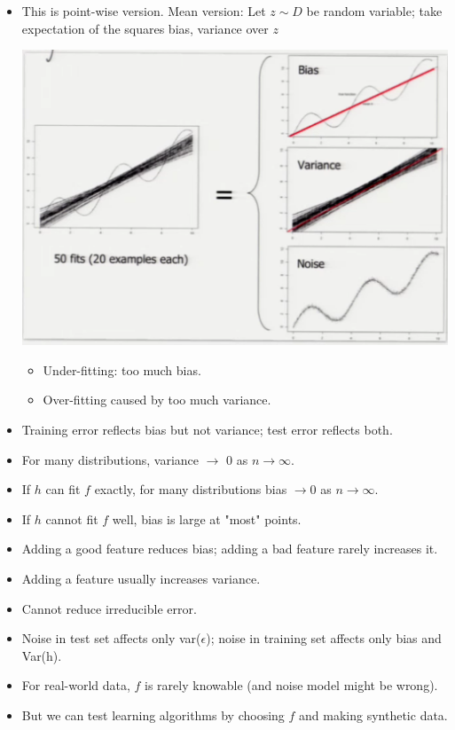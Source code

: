 \documentclass[10pt]{article}
\begin{document}
\begin{itemize}
			\item This is point-wise version. Mean version: Let $z \sim D$ be random variable; take expectation of the squares bias, variance over $z$
				\begin{center}
					\includegraphics[scale=0.5]{images/noise}
				\end{center}
				\begin{itemize}
					\item Under-fitting: too much bias.
					\item Over-fitting caused by too much variance. 
				\end{itemize}
			\item Training error reflects bias but not variance; test error reflects both.
			\item For many distributions, variance $\rightarrow$ 0 as $n \rightarrow \infty$.
			\item If $h$ can fit $f$ exactly, for many distributions bias $\rightarrow 0$ as $n \rightarrow \infty$.
			\item If $h$ cannot fit $f$ well, bias is large at "most" points.
			\item Adding a good feature reduces bias; adding a bad feature rarely increases it.
			\item Adding a feature usually increases variance.
			\item Cannot reduce irreducible error.
			\item Noise in test set affects only var($\epsilon$); noise in training set affects only bias and Var(h).
			\item For real-world data, $f$ is rarely knowable (and noise model might be wrong).
			\item But we can test learning algorithms by choosing $f$ and making synthetic data.

\end{itemize}
\end{document}
